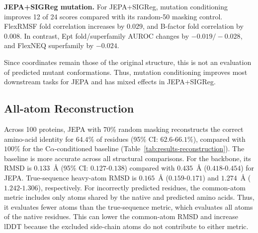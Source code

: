 \textbf{JEPA+SIGReg mutation. } For JEPA+SIGReg, mutation conditioning improves 12 of 24 scores compared with its random-50 masking control.
FlexRMSF fold correlation increases by $0.029$, and B-factor fold correlation by $0.008$.
In contrast, Ept fold/superfamily AUROC changes by $-0.019/-0.028$, and FlexNEQ superfamily by $-0.024$.

Since coordinates remain those of the original structure, this is not an evaluation of predicted mutant conformations.
Thus, mutation conditioning improves most downstream tasks for JEPA and has mixed effects in JEPA+SIGReg.

\subsection{All-atom Reconstruction}
\label{sec:results-reconstruction}


Across 100 proteins, JEPA with 70\% random masking reconstructs the correct amino-acid identity for $64.4\%$ of residues (95\% CI: $62.6$-$66.1\%$), compared with $100\%$ for the C$\alpha$-conditioned baseline (Table~\ref{tab:results-reconstruction}). The baseline is more accurate across all structural comparisons. For the backbone, its RMSD is $0.133$~\AA{} (95\% CI: $0.127$-$0.138$) compared with $0.435$~\AA{} ($0.418$-$0.454$) for JEPA. True-sequence heavy-atom RMSD is $0.165$~\AA{} ($0.159$-$0.171$) and $1.274$~\AA{} ($1.242$-$1.306$), respectively. For incorrectly predicted residues, the common-atom metric includes only atoms shared by the native and predicted amino acids. Thus, it evaluates fewer atoms than the true-sequence metric, which evaluates all atoms of the native residues. This can lower the common-atom RMSD and increase lDDT because the excluded side-chain atoms do not contribute to either metric.

